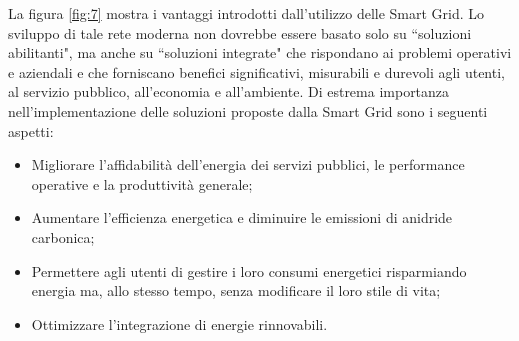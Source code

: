 \begin{figure}[h]
\end{figure}
La figura \ref{fig:7} mostra i vantaggi introdotti dall'utilizzo delle Smart Grid. Lo sviluppo di tale rete moderna non dovrebbe essere basato solo su ``soluzioni abilitanti", ma anche su ``soluzioni integrate" che rispondano ai problemi operativi e aziendali e che forniscano benefici significativi, misurabili e durevoli agli utenti, al servizio pubblico, all'economia e all'ambiente.
\newline 
Di estrema importanza nell'implementazione delle soluzioni proposte dalla Smart Grid sono i seguenti aspetti:
\begin{itemize}
\item Migliorare l'affidabilità dell'energia dei servizi pubblici, le performance operative e la produttività generale;
\item Aumentare l'efficienza energetica e diminuire le emissioni di anidride carbonica;
\item Permettere agli utenti di gestire i loro consumi energetici risparmiando energia ma, allo stesso tempo, senza modificare il loro stile di vita;
\item Ottimizzare l'integrazione di energie rinnovabili.
\end{itemize}

